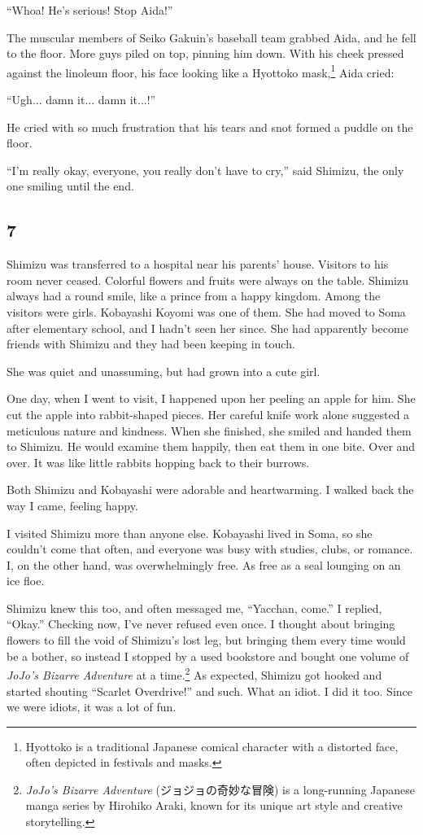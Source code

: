 \documentclass[
    a4paper,
    12pt,
    twoside,
    openany,
    UTF8,
    fontset=windows
]{ctexbook}
\begin{document}
``Whoa! He's serious! Stop Aida!''

The muscular members of Seiko Gakuin's baseball team grabbed Aida, and he fell to the floor. More guys piled on top, pinning him down. With his cheek pressed against the linoleum floor, his face looking like a Hyottoko mask,\footnote{Hyottoko is a traditional Japanese comical character with a distorted face, often depicted in festivals and masks.} Aida cried:

``Ugh... damn it... damn it...!''

He cried with so much frustration that his tears and snot formed a puddle on the floor.

``I'm really okay, everyone, you really don't have to cry,'' said Shimizu, the only one smiling until the end.


\subsection*{7}

Shimizu was transferred to a hospital near his parents' house. Visitors to his room never ceased. Colorful flowers and fruits were always on the table. Shimizu always had a round smile, like a prince from a happy kingdom. Among the visitors were girls. Kobayashi Koyomi was one of them. She had moved to Soma after elementary school, and I hadn't seen her since. She had apparently become friends with Shimizu and they had been keeping in touch.

She was quiet and unassuming, but had grown into a cute girl.

One day, when I went to visit, I happened upon her peeling an apple for him. She cut the apple into rabbit-shaped pieces. Her careful knife work alone suggested a meticulous nature and kindness. When she finished, she smiled and handed them to Shimizu. He would examine them happily, then eat them in one bite. Over and over. It was like little rabbits hopping back to their burrows.

Both Shimizu and Kobayashi were adorable and heartwarming. I walked back the way I came, feeling happy.

I visited Shimizu more than anyone else. Kobayashi lived in Soma, so she couldn't come that often, and everyone was busy with studies, clubs, or romance. I, on the other hand, was overwhelmingly free. As free as a seal lounging on an ice floe.

Shimizu knew this too, and often messaged me, ``Yacchan, come.'' I replied, ``Okay.'' Checking now, I've never refused even once. I thought about bringing flowers to fill the void of Shimizu's lost leg, but bringing them every time would be a bother, so instead I stopped by a used bookstore and bought one volume of \textit{JoJo's Bizarre Adventure} at a time.\footnote{\textit{JoJo's Bizarre Adventure} (ジョジョの奇妙な冒険) is a long-running Japanese manga series by Hirohiko Araki, known for its unique art style and creative storytelling.} As expected, Shimizu got hooked and started shouting ``Scarlet Overdrive!'' and such. What an idiot. I did it too. Since we were idiots, it was a lot of fun.
\end{document}
